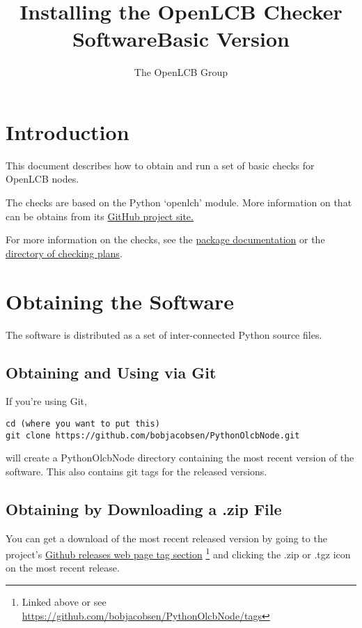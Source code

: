 \documentclass[11pt]{article}
\title{Installing the OpenLCB Checker Software\linebreak{}Basic Version}
\author{The OpenLCB Group}
\begin{document}
\maketitle


\section{Introduction}

This document describes how to obtain and run a set of basic checks for 
OpenLCB nodes.  

The checks are based on the Python `openlch' module.
More information on that can be obtains from its
\href{https://github.com/bobjacobsen/PythonOlcbNode}{GitHub project site.}

For more information on the checks, see the
\href{https://github.com/bobjacobsen/PythonOlcbNode/blob/main/olcbchecker/README.md}{package documentation}
or the 
\href{https://github.com/bobjacobsen/PythonOlcbNode/tree/main/olcbchecker/plans/}{directory of checking plans}.

\section{Obtaining the Software}

The software is distributed as a set of inter-connected Python source files.

\subsection{Obtaining and Using via Git}

If you're using Git, 
\begin{verbatim}
cd (where you want to put this)
git clone https://github.com/bobjacobsen/PythonOlcbNode.git
\end{verbatim}
will create a PythonOlcbNode directory containing the most recent version of the software.
This also contains git tags for the released versions.

\subsection{Obtaining by Downloading a .zip File}

You can get a download of the most recent released version by going to the project's 
\href{https://github.com/bobjacobsen/PythonOlcbNode/tags}{Github releases web page tag section}
\footnote{Linked above or see \href{https://github.com/bobjacobsen/PythonOlcbNode/tags}{https://github.com/bobjacobsen/PythonOlcbNode/tags}}
and clicking the .zip or .tgz icon on the most recent release.
\end{document}
